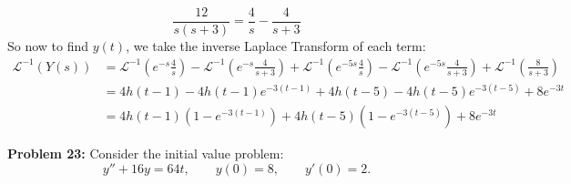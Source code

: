 \documentclass[12pt]{article}
\begin{document}
\begin{enumerate}[label = (\alph*)]
			$$
			\frac{12}{s(s+3)} = \frac{4}{s} - \frac{4}{s+3}
			$$
		So now to find $y(t)$, we take the inverse Laplace Transform of each term:
			\begin{align*}
			\mathcal{L}^{-1}(Y(s)) &= \mathcal{L}^{-1}\left(e^{-s}\frac{4}{s}\right) - \mathcal{L}^{-1}\left(e^{-s}\frac{4}{s+3}\right) + \mathcal{L}^{-1}\left(e^{-5s}\frac{4}{s}\right) - \mathcal{L}^{-1}\left(e^{-5s}\frac{4}{s+3}\right) + \mathcal{L}^{-1}\left(\frac{8}{s+3}\right) \\
			&= 4h(t-1) - 4h(t-1)e^{-3(t-1)} + 4h(t-5) - 4h(t-5)e^{-3(t-5)} + 8e^{-3t} \\
			&= 4h(t-1)(1 - e^{-3(t-1)}) + 4h(t-5) (1 -e^{-3(t-5)}) + 8e^{-3t}
			\end{align*}
	\end{enumerate}
	
\newpage 

\noindent \textbf{Problem 23: }Consider the initial value problem:
	$$
	y'' + 16y = 64t,
	\qquad y(0) = 8, \qquad y'(0) = 2.
	$$
\end{document}

